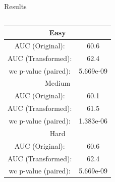 \documentclass[final]{beamer} %
\begin{document}
\begin{frame}{}
\begin{block}{Results}
\begin{columns}
        \begin{column}{0.25\textwidth}
          \center
          \scriptsize
          \begin{tabular}{| c c |}
            \multicolumn{2}{c}{Easy} \\ 
            \midrule
            AUC (Original): & 60.6 \\ 
            AUC (Transformed): & 62.4 \\
            wc p-value (paired): & 5.669e-09 \\ 
            \toprule
            \multicolumn{2}{c}{Medium} \\ 
            \midrule
            AUC (Original): & 60.1 \\ 
            AUC (Transformed): & 61.5 \\ 
            wc p-value (paired): & 1.383e-06 \\ 
            \toprule
            \multicolumn{2}{c}{Hard} \\ 
            \midrule
            AUC (Original): & 60.6 \\ 
            AUC (Transformed): & 62.4 \\ 
            wc p-value (paired): & 5.669e-09 \\ \hline
          \end{tabular}        
        \end{column}
      \end{columns}
    \end{block}
  \end{frame}
\end{document}
